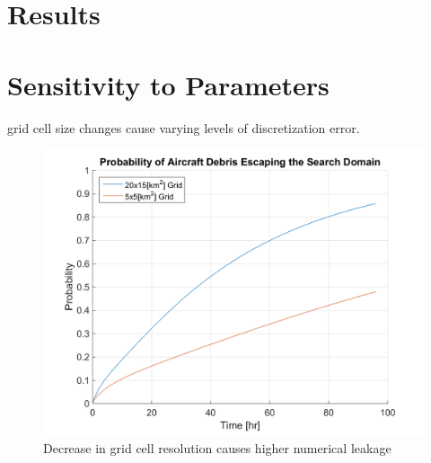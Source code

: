 \documentclass[12pt, letterpaper]{article}  %
\theoremstyle{definition}
\theoremstyle{remark}
\theoremstyle{plain}
\begin{document}

\section{Results}\label{sec:results}










\section{Sensitivity to Parameters}\label{sec:sensitive}


grid cell size changes cause varying levels of discretization error.

\begin{center}
	\begin{figure}[H]
		\centering
		\includegraphics[width=0.8\linewidth]{simulation/NoSearchEscapeExplain}
		\caption{Decrease in grid cell resolution causes higher numerical leakage}
		\label{fig:NoSearchEscapeExplain}
	\end{figure}
\end{center}
\end{document}
